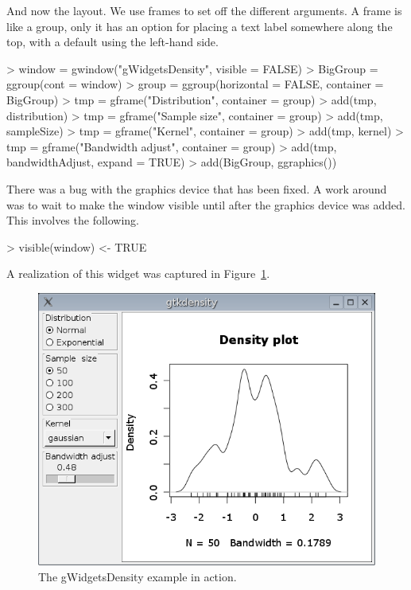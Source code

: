 \documentclass[12pt]{article}
\begin{document}
And now the layout. We use frames to set off the different
arguments. A frame is like a group, only it has an option for placing
a text label somewhere along the top, with a default using the left-hand
side.
\begin{Schunk}
\begin{Sinput}
> window = gwindow("gWidgetsDensity", visible = FALSE)
> BigGroup = ggroup(cont = window)
> group = ggroup(horizontal = FALSE, container = BigGroup)
> tmp = gframe("Distribution", container = group)
> add(tmp, distribution)
> tmp = gframe("Sample  size", container = group)
> add(tmp, sampleSize)
> tmp = gframe("Kernel", container = group)
> add(tmp, kernel)
> tmp = gframe("Bandwidth adjust", container = group)
> add(tmp, bandwidthAdjust, expand = TRUE)
> add(BigGroup, ggraphics())
\end{Sinput}
\end{Schunk}

There was a bug with the graphics device that has been fixed. A work
around was to wait to make the window visible until after the graphics
device was added. This involves the following.
\begin{Schunk}
\begin{Sinput}
> visible(window) <- TRUE
\end{Sinput}
\end{Schunk}


A realization of this widget was captured in Figure~\ref{fig:gtkdensity}.

\begin{figure}
  \centering
  \includegraphics[width=.6\textwidth]{gtkdensity}
  \caption{The gWidgetsDensity example in action.}
  \label{fig:gtkdensity}
\end{figure}
\end{document}
